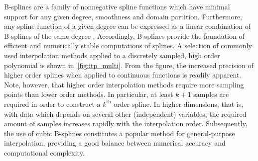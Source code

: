 B-splines are a family of nonnegative spline functions which have minimal
support for any given degree, smoothness and domain partition. Furthermore, any
spline function of a given degree can be expressed as a linear combination
of B-splines of the same degree
\parencite[pp.107--110]{stoer2002introduction}. Accordingly, B-splines provide
the foundation of efficient and numerically stable computations of splines.
A selection of commonly used interpolation methods applied to a discretely
sampled, high order polynomial is shown in~\cref{fig:itp_multi}. From the
figure, the increased precision of higher order splines when applied to
continuous functions is readily apparent. Note, however, that higher order
interpolation methods require more sampling points than lower order methods.
In particular, at least $k+1$ samples are required in order to construct a
$k^{\text{th}}$ order spline. In higher dimensions, that is, with data which
depends on several other (independent) variables, the required amount of samples
increases rapidly with the interpolation order. Subsequently, the use of cubic
B-splines constitutes a popular method for general-purpose interpolation,
providing a good balance between numerical accuracy and computational complexity.

